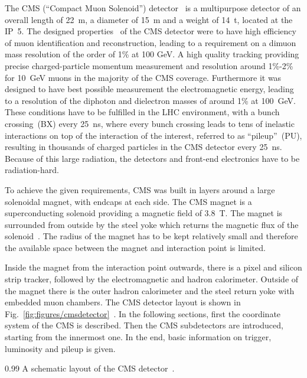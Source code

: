 The CMS (``Compact Muon Solenoid'') detector~\cite{Chatrchyan:2008aa} is a multipurpose detector of an overall length of 22~m, a diameter of 15~m and a weight of 14~t, located at the IP~5. The designed properties~\cite{CMSproposal} of the CMS  detector were to have high efficiency of muon identification and reconstruction, leading to a requirement on  a dimuon mass resolution of the order of 1\% at 100 GeV. A high quality tracking providing precise charged-particle momentum measurement and resolution around 1\%-2\% for 10~GeV muons in the majority of the CMS coverage. Furthermore it was designed to have best possible measurement the electromagnetic energy, leading to a resolution of the diphoton and dielectron masses of around 1\% at 100~GeV. These conditions have to be fulfilled in the LHC environment, with a bunch crossing~(BX) every 25~ns, where every bunch crossing leads to tens of inelastic interactions on top of the interaction of the interest, referred to as ``pileup''~(PU), resulting in thousands of charged particles in the CMS detector every 25~ns. Because of this large radiation, the detectors and front-end electronics have to be radiation-hard.

To achieve the given requirements, CMS was built in layers around a large solenoidal magnet, with endcaps at each side. The CMS magnet is a superconducting solenoid providing a magnetic field of 3.8~T. The magnet is surrounded from outside by the steel yoke which returns the magnetic flux of the solenoid~\cite{tdrMagnet}. The radius of the magnet has to be kept relatively small and therefore the available space between the magnet and interaction point is limited.

Inside the magnet from the interaction point outwards, there is a pixel and silicon strip tracker, followed by the electromagnetic and hadron calorimeter. Outside of the magnet there is the outer hadron calorimeter and the steel return yoke with embedded muon chambers. The CMS detector layout is shown in Fig.~\ref{fig:figures/cmsdetector}~\cite{website:CMSdet}. In the following sections, first the coordinate system of the CMS is described. Then the CMS subdetectors are introduced, starting from the innermost one. In the end, basic information on trigger, luminosity and pileup is given.


                 {0.99}       %
                 { A schematic layout of the CMS detector~\cite{website:CMSdet}. }

